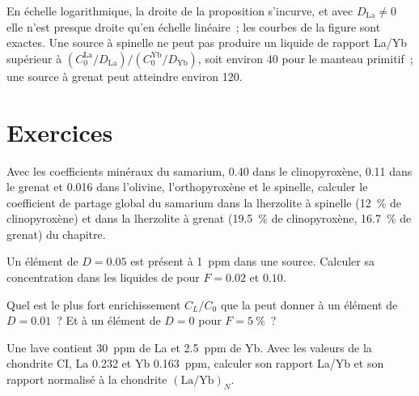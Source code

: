 En échelle logarithmique, la droite de la proposition s'incurve, et avec
$D_{\mathrm{La}} \ne 0$ elle n'est presque droite qu'en échelle linéaire~; les courbes
de la figure sont exactes. Une source à spinelle ne peut pas produire un liquide de rapport La/Yb supérieur à
$(C_0^{\mathrm{La}}/D_{\mathrm{La}})/(C_0^{\mathrm{Yb}}/D_{\mathrm{Yb}})$,
soit environ 40 pour le manteau primitif~; une source à grenat peut atteindre environ 120.

\section{Exercices}

\begin{exercise}[$\star$]\label{exo:b3:trace-element-modelling:1}
Avec les coefficients minéraux du samarium, 0.40 dans le clinopyroxène, 0.11
dans le grenat et 0.016 dans l'olivine, l'orthopyroxène et le spinelle, calculer le
coefficient de partage global du samarium dans la lherzolite à spinelle (\qty{12}{\percent}
de clinopyroxène) et dans la lherzolite à grenat (\qty{19.5}{\percent} de clinopyroxène,
\qty{16.7}{\percent} de grenat) du chapitre.
\end{exercise}

\begin{exercise}[$\star$]\label{exo:b3:trace-element-modelling:2}
Un élément de $D = 0.05$ est présent à \qty{1}{ppm} dans une source. Calculer
sa concentration dans les liquides de  pour $F = 0.02$ et $0.10$.
\end{exercise}

\begin{exercise}[$\star$]\label{exo:b3:trace-element-modelling:3}
Quel est le plus fort enrichissement $C_L/C_0$ que la  peut
donner à un élément de $D = 0.01$~? Et à un élément de $D = 0$ pour
$F = \qty{5}{\percent}$~?
\end{exercise}

\begin{exercise}[$\star$]\label{exo:b3:trace-element-modelling:4}
Une lave contient \qty{30}{ppm} de La et \qty{2.5}{ppm} de Yb. Avec les valeurs
de la chondrite CI, La 0.232 et Yb \qty{0.163}{ppm}, calculer son rapport La/Yb et son
rapport normalisé à la chondrite $(\mathrm{La}/\mathrm{Yb})_N$.
\end{exercise}

